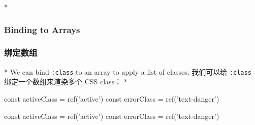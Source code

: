 \begin{paracol}{2}
\switchcolumn[0]*%
\subsubsection{Binding to Arrays}
\switchcolumn
\subsubsection{绑定数组}
\switchcolumn[0]*%
We can bind \texttt{:class} to an array to apply a list of classes:
\switchcolumn
我们可以给 \texttt{:class} 绑定一个数组来渲染多个 CSS class：
\switchcolumn[0]*%
\begin{codeJs}
const activeClass = ref('active')
const errorClass = ref('text-danger')
\end{codeJs}
\switchcolumn
\begin{codeJs}
const activeClass = ref('active')
const errorClass = ref('text-danger')
\end{codeJs}


\end{paracol}
